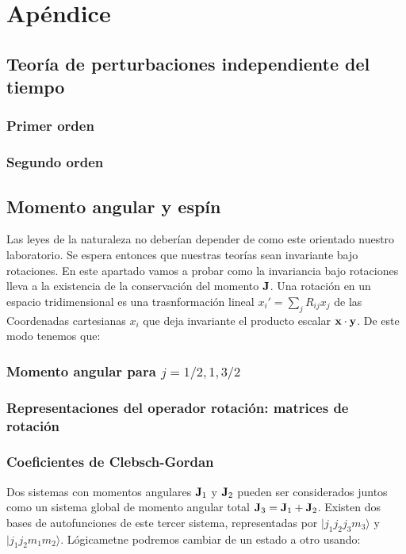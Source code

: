 \appendix 
\chapter{Apéndice}

\section{Teoría de perturbaciones independiente del tiempo}

\subsection{Primer orden}

\subsection{Segundo orden}


\section{Momento angular y espín}

Las leyes de la naturaleza no deberían depender de como este orientado nuestro laboratorio. Se espera entonces que nuestras teorías sean invariante bajo rotaciones. En este apartado vamos a probar como la invariancia bajo rotaciones lleva a la existencia de la conservación del momento $\mathbf{J}$. Una rotación en un espacio tridimensional es una trasnformación lineal $x_i'=\sum_j R_{ij} x_j$ de las Coordenadas cartesianas  $x_i$ que deja invariante el producto escalar $\mathbf{x} \cdot \mathbf{y}$. De este modo tenemos que:

\subsection{Momento angular para $j=1/2,1,3/2$}

\subsection{Representaciones del operador rotación: matrices de rotación}


\subsection{Coeficientes de Clebsch-Gordan}

Dos sistemas con momentos angulares $\mathbf{J}_1$ y $\mathbf{J}_2$ pueden ser considerados juntos como un sistema global de momento angular total $\mathbf{J}_3 = \mathbf{J}_1 + \mathbf{J}_2$. Existen dos bases de autofunciones de este tercer sistema, representadas por $|j_1 j_2 j_3 m_3\rangle$ y $|j_1 j_2 m_1 m_2\rangle$. Lógicametne podremos cambiar de un estado a otro usando:

